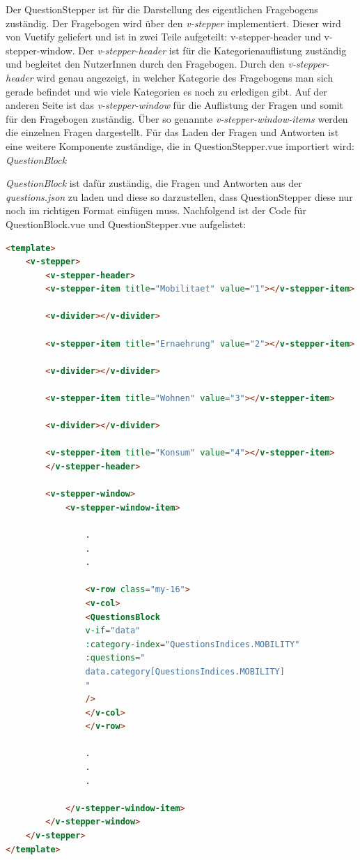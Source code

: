 Der QuestionStepper ist für die Darstellung des eigentlichen Fragebogens zuständig.
Der Fragebogen wird über den \textit{v-stepper} implementiert.
Dieser wird von Vuetify geliefert und ist in zwei Teile aufgeteilt: v-stepper-header und v-stepper-window.
Der \textit{v-stepper-header} ist für die Kategorienauflistung zuständig und begleitet den NutzerInnen durch den Fragebogen.
Durch den \textit{v-stepper-header} wird genau angezeigt, in welcher Kategorie des Fragebogens man sich gerade befindet und wie viele Kategorien es noch zu erledigen gibt.
Auf der anderen Seite ist das \textit{v-stepper-window} für die Auflistung der Fragen und somit für den Fragebogen zuständig.
Über so genannte \textit{v-stepper-window-items} werden die einzelnen Fragen dargestellt.
Für das Laden der Fragen und Antworten ist eine weitere Komponente zuständige, die in QuestionStepper.vue importiert wird: \textit{QuestionBlock}

\textit{QuestionBlock} ist dafür zuständig, die Fragen und Antworten aus der \textit{questions.json} zu laden und diese so darzustellen, dass QuestionStepper diese nur noch im richtigen Format einfügen muss.
Nachfolgend ist der Code für QuestionBlock.vue und QuestionStepper.vue aufgelistet:

\begin{lstlisting}[language={html}, caption={QuestionStepper.vue}]
<template>
    <v-stepper>
        <v-stepper-header>
        <v-stepper-item title="Mobilitaet" value="1"></v-stepper-item>

        <v-divider></v-divider>

        <v-stepper-item title="Ernaehrung" value="2"></v-stepper-item>

        <v-divider></v-divider>

        <v-stepper-item title="Wohnen" value="3"></v-stepper-item>

        <v-divider></v-divider>

        <v-stepper-item title="Konsum" value="4"></v-stepper-item>
        </v-stepper-header>

        <v-stepper-window>
            <v-stepper-window-item>

                .
                .
                .

                <v-row class="my-16">
                <v-col>
                <QuestionsBlock
                v-if="data"
                :category-index="QuestionsIndices.MOBILITY"
                :questions="
                data.category[QuestionsIndices.MOBILITY]
                "
                />
                </v-col>
                </v-row>

                .
                .
                .

            </v-stepper-window-item>
        </v-stepper-window>
    </v-stepper>
</template>
\end{lstlisting}

